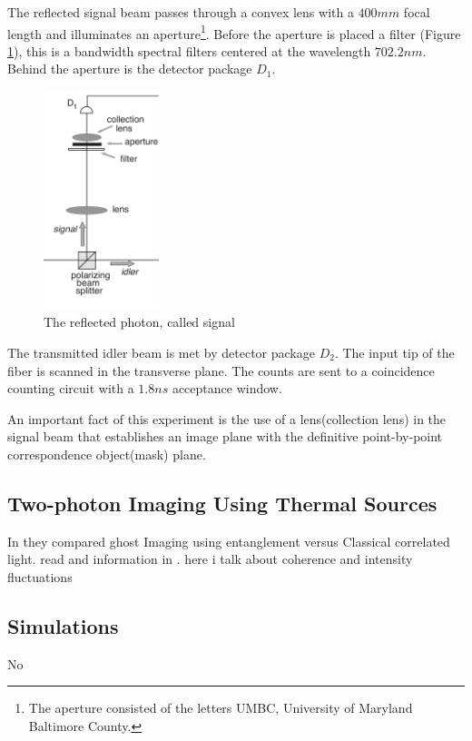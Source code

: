 The reflected signal beam passes through a 
convex lens with a $400mm$ focal length and illuminates an aperture\footnote{The aperture 
consisted of the letters UMBC, University of Maryland Baltimore County.}.
Before the aperture is placed a filter (Figure \ref{fig:signal}), 
this is a bandwidth spectral filters centered at the
wavelength $702.2 nm$. 
Behind the aperture is the detector package $D_1$. \\
\begin{figure}[H]
\centering
\includegraphics[width=0.3\textwidth]{Figures/signal.png}
\caption{The reflected photon, called signal} 
\label{fig:signal}
\end{figure}


The transmitted idler beam is met by detector 
package $D_2$. The input tip of the fiber is scanned in the transverse 
plane. The counts are sent to a coincidence 
counting circuit with a $1.8ns$ acceptance window.


An important fact of this experiment is the use of a lens(collection lens) in the signal beam that establishes an image plane with the definitive point-by-point correspondence object(mask) plane.




\subsection{Two-photon Imaging Using Thermal Sources}

In \cite{thermal} they compared ghost Imaging using entanglement versus Classical correlated light. read and information in \cite{thermalAlejandra}. here i talk about coherence and intensity fluctuations \cite{intensity}

\subsection{Simulations}

No\cite{simulated}



